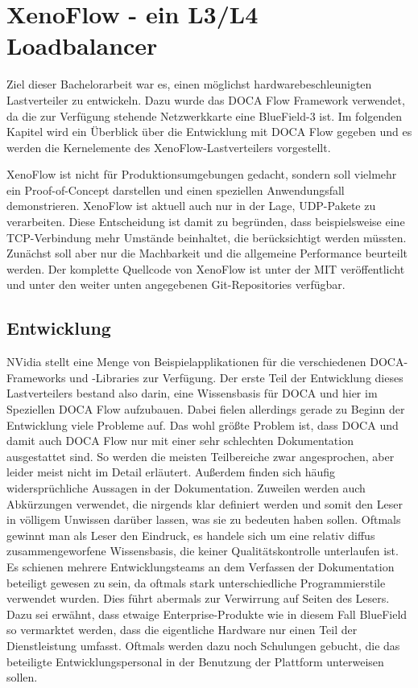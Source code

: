 \chapter{XenoFlow - ein L3/L4 Loadbalancer}
\label{cha:implementation}
Ziel dieser Bachelorarbeit war es, einen möglichst hardwarebeschleunigten Lastverteiler zu entwickeln. Dazu wurde das DOCA Flow Framework verwendet, da die zur Verfügung stehende Netzwerkkarte eine BlueField-3 ist. Im folgenden Kapitel wird ein Überblick über die Entwicklung mit DOCA Flow gegeben und es werden die Kernelemente des XenoFlow-Lastverteilers vorgestellt. 

XenoFlow ist nicht für Produktionsumgebungen gedacht, sondern soll vielmehr ein Proof-of-Concept darstellen und einen speziellen Anwendungsfall demonstrieren. XenoFlow ist aktuell auch nur in der Lage, UDP-Pakete zu verarbeiten. Diese Entscheidung ist damit zu begründen, dass beispielsweise eine TCP-Verbindung mehr Umstände beinhaltet, die berücksichtigt werden müssten. Zunächst soll aber nur die Machbarkeit und die allgemeine Performance beurteilt werden. Der komplette Quellcode von XenoFlow ist unter der MIT veröffentlicht und unter den weiter unten angegebenen Git-Repositories verfügbar.
\section{Entwicklung}
NVidia stellt eine Menge von Beispielapplikationen für die verschiedenen DOCA-Frameworks und -Libraries zur Verfügung. Der erste Teil der Entwicklung dieses Lastverteilers bestand also darin, eine Wissensbasis für DOCA und hier im Speziellen DOCA Flow aufzubauen. Dabei fielen allerdings gerade zu Beginn der Entwicklung viele Probleme auf. Das wohl größte Problem ist, dass DOCA und damit auch DOCA Flow nur mit einer sehr schlechten Dokumentation ausgestattet sind. So werden die meisten Teilbereiche zwar angesprochen, aber leider meist nicht im Detail erläutert. Außerdem finden sich häufig widersprüchliche Aussagen in der Dokumentation. Zuweilen werden auch Abkürzungen verwendet, die nirgends klar definiert werden und somit den Leser in völligem Unwissen darüber lassen, was sie zu bedeuten haben sollen. Oftmals gewinnt man als Leser den Eindruck, es handele sich um eine relativ diffus zusammengeworfene Wissensbasis, die keiner Qualitätskontrolle unterlaufen ist. Es schienen mehrere Entwicklungsteams an dem Verfassen der Dokumentation beteiligt gewesen zu sein, da oftmals stark unterschiedliche Programmierstile verwendet wurden. Dies führt abermals zur Verwirrung auf Seiten des Lesers. Dazu sei erwähnt, dass etwaige Enterprise-Produkte wie in diesem Fall BlueField so vermarktet werden, dass die eigentliche Hardware nur einen Teil der Dienstleistung umfasst. Oftmals werden dazu noch Schulungen gebucht, die das beteiligte Entwicklungspersonal in der Benutzung der Plattform unterweisen sollen. 

